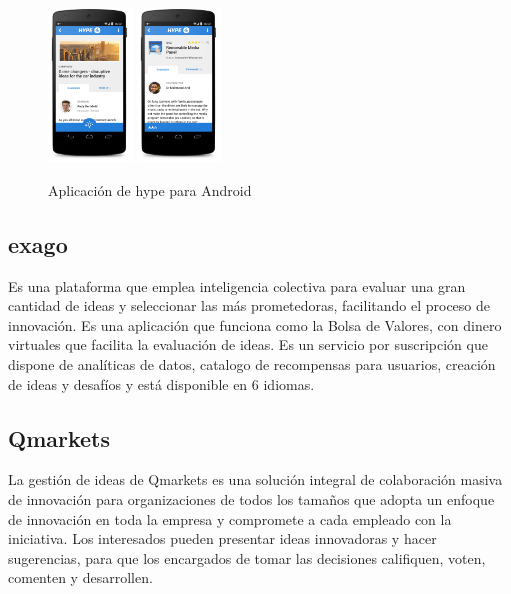 \begin{figure}[!h]
	\begin{center}
		\includegraphics[width=0.2\textwidth]{./img/competencia/hype/1.png}
		\includegraphics[width=0.2\textwidth]{./img/competencia/hype/2.png}
		\caption{Aplicación de hype para Android}
		\label{fig:hype}
	\end{center}
\end{figure}

\subsection{exago}

Es una plataforma que emplea inteligencia colectiva para evaluar una 
gran cantidad de ideas y seleccionar las más prometedoras, facilitando 
el proceso de innovación. Es una aplicación que funciona como la Bolsa de Valores, con dinero
virtuales que facilita la evaluación de ideas. Es un servicio por suscripción que dispone 
de analíticas de datos, catalogo de recompensas para usuarios, creación de ideas y desafíos y 
está disponible en  6 idiomas.

\subsection{Qmarkets}

La gestión de ideas de Qmarkets es una solución integral de colaboración masiva de innovación para
 organizaciones de todos los tamaños que adopta un enfoque de innovación en toda la empresa y compromete a cada empleado con la iniciativa. Los interesados pueden presentar ideas innovadoras y hacer sugerencias, 
 para que los encargados de tomar las decisiones califiquen, voten, comenten y desarrollen. 


